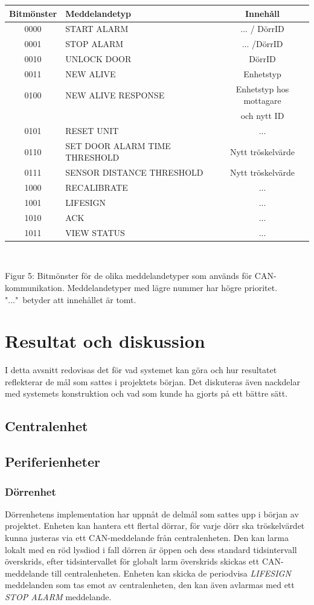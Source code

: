 \documentclass{article}
\begin{document}
\begin{tabular}{|c|l|c|}
    \hline
    Bitmönster & Meddelandetyp & Innehåll \\
    \hline
    0000 & START ALARM & ... / DörrID \\
    0001 & STOP ALARM & ... /DörrID \\
    0010 & UNLOCK DOOR & DörrID \\
    0011 & NEW ALIVE & Enhetstyp \\
    0100 & NEW ALIVE RESPONSE & Enhetstyp hos mottagare \\ 
    &&och nytt ID \\
    0101 & RESET UNIT & ... \\
    0110 & SET DOOR ALARM TIME THRESHOLD & Nytt tröskelvärde \\
    0111 & SENSOR DISTANCE THRESHOLD & Nytt tröskelvärde \\
    1000 & RECALIBRATE & ... \\
    1001 & LIFESIGN & ... \\
    1010 & ACK & ... \\
    1011 & VIEW STATUS & ... \\
    \hline
\end{tabular}
\\
\begin{center}
\caption{Figur 5: Bitmönster för de olika meddelandetyper som används för CAN-kommunikation. Meddelandetyper med lägre nummer har högre prioritet. "..."\ betyder att innehållet är tomt.}
\end{center}

\section{Resultat och diskussion}
I detta avsnitt redovisas det för vad systemet kan göra och hur resultatet reflekterar de mål som sattes i projektets början. Det diskuteras även nackdelar med systemets konstruktion och vad som kunde ha gjorts på ett bättre sätt.

\subsection{Centralenhet}

\subsection{Periferienheter}

\subsubsection{Dörrenhet}
Dörrenhetens implementation har uppnåt de delmål som sattes upp i början av projektet. Enheten kan hantera ett flertal dörrar, för varje dörr ska tröskelvärdet kunna justeras via ett CAN-meddelande från centralenheten. Den kan larma lokalt med en röd lysdiod i fall dörren är öppen och dess standard tidsintervall överskrids, efter tidsintervallet för globalt larm överskrids skickas ett CAN-meddelande till centralenheten. Enheten kan skicka de periodvisa \emph{LIFESIGN} meddelanden som tas emot av centralenheten, den kan även avlarmas med ett \emph{STOP ALARM} meddelande.
\end{document}
